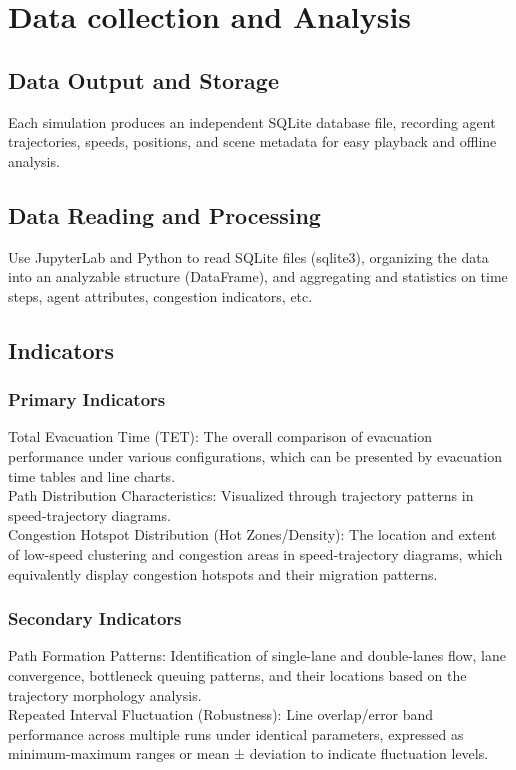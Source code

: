 \section{Data collection and Analysis}

\subsection{Data Output and Storage}
Each simulation produces an independent SQLite database file, recording agent trajectories, speeds, positions, and scene metadata for easy playback and offline analysis.
\subsection{Data Reading and Processing}
Use JupyterLab and Python to read SQLite files (sqlite3), organizing the data into an analyzable structure (DataFrame), and aggregating and statistics on time steps, agent attributes, congestion indicators, etc.

\subsection{Indicators}
\subsubsection{Primary Indicators}
Total Evacuation Time (TET): The overall comparison of evacuation performance under various configurations, which can be presented by evacuation time tables and line charts.
\\
Path Distribution Characteristics: Visualized through trajectory patterns in speed-trajectory diagrams.
\\
Congestion Hotspot Distribution (Hot Zones/Density): The location and extent of low-speed clustering and congestion areas in speed-trajectory diagrams, which equivalently display congestion hotspots and their migration patterns.
\\
\subsubsection{Secondary Indicators}
Path Formation Patterns: Identification of single-lane and double-lanes flow, lane convergence, bottleneck queuing patterns, and their locations based on the trajectory morphology analysis.
\\
Repeated Interval Fluctuation (Robustness): Line overlap/error band performance across multiple runs under identical parameters, expressed as minimum-maximum ranges or mean ± deviation to indicate fluctuation levels.

